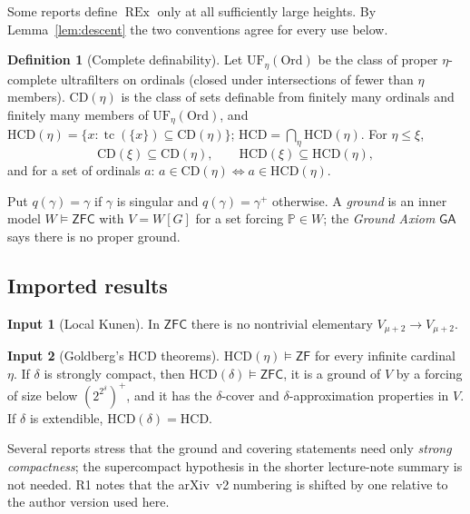 \documentclass[11pt,letterpaper]{article}
\theoremstyle{definition}
\newtheorem{definition}{Definition}[section]
\newtheorem{inputthm}{Input}
\numberwithin{equation}{section}
\newcommand{\ZFC}{\mathsf{ZFC}}
\newcommand{\ZF}{\mathsf{ZF}}
\newcommand{\GA}{\mathsf{GA}}
\newcommand{\CD}{\mathrm{CD}}
\newcommand{\HCD}{\mathrm{HCD}}
\newcommand{\UF}{\mathrm{UF}}
\newcommand{\REx}{\operatorname{REx}}
\newcommand{\Ord}{\mathrm{Ord}}
\newcommand{\PP}{\mathbb P}
\newcommand{\R}[1]{\textsf{R#1}}
\begin{document}
Some reports define $\REx$ only at all sufficiently large heights. By Lemma~\ref{lem:descent} the two conventions agree for every use below.

\begin{definition}[Complete definability]\label{def:hcd}
Let $\UF_\eta(\Ord)$ be the class of proper $\eta$-complete ultrafilters on ordinals (closed under intersections of fewer than $\eta$ members). $\CD(\eta)$ is the class of sets definable from finitely many ordinals and finitely many members of $\UF_\eta(\Ord)$, and $\HCD(\eta)=\{x:\operatorname{tc}(\{x\})\subseteq\CD(\eta)\}$; $\HCD=\bigcap_\eta\HCD(\eta)$. For $\eta\le\xi$,
\begin{equation}\label{eq:mono}
\CD(\xi)\subseteq\CD(\eta),\qquad\HCD(\xi)\subseteq\HCD(\eta),
\end{equation}
and for a set of ordinals $a$: $a\in\CD(\eta)\iff a\in\HCD(\eta)$.
\end{definition}

Put $q(\gamma)=\gamma$ if $\gamma$ is singular and $q(\gamma)=\gamma^+$ otherwise. A \emph{ground} is an inner model $W\models\ZFC$ with $V=W[G]$ for a set forcing $\PP\in W$; the \emph{Ground Axiom} $\GA$ says there is no proper ground.

\subsection{Imported results}

\begin{inputthm}[Local Kunen]\label{in:kunen}
In $\ZFC$ there is no nontrivial elementary $V_{\mu+2}\to V_{\mu+2}$. \cite{kunen,hkp}
\end{inputthm}

\begin{inputthm}[Goldberg's $\HCD$ theorems]\label{in:hcd}
$\HCD(\eta)\models\ZF$ for every infinite cardinal $\eta$. If $\delta$ is strongly compact, then $\HCD(\delta)\models\ZFC$, it is a ground of $V$ by a forcing of size below $(2^{2^\delta})^+$, and it has the $\delta$-cover and $\delta$-approximation properties in $V$. If $\delta$ is extendible, $\HCD(\delta)=\HCD$. \cite[Prop.~4.2--4.3, Thm.~4.4, 4.10, Prop.~4.11, Thm.~4.14--4.15]{unique}
\end{inputthm}

Several reports stress that the ground and covering statements need only \emph{strong compactness}; the supercompact hypothesis in the shorter lecture-note summary is not needed. \R1 notes that the arXiv~v2 numbering is shifted by one relative to the author version used here.
\end{document}
